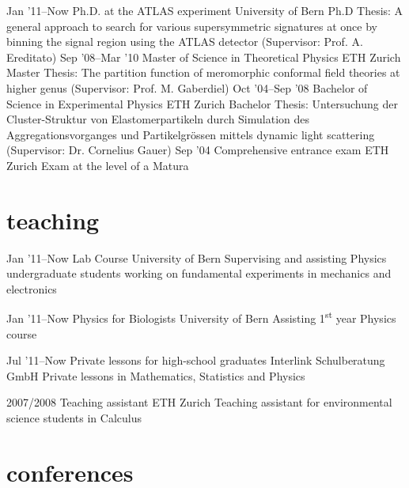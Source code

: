 \documentclass[]{cv} %
\begin{document}
\begin{entrylist}
\entry
{Jan '11--Now}
{Ph.D. {\normalfont at the} ATLAS experiment}
{University of Bern}
{Ph.D Thesis: A general approach to search for various supersymmetric signatures at once by binning the signal region using the ATLAS detector (Supervisor:
  Prof. A. Ereditato)}
\entry
{Sep '08--Mar '10}
{Master {\normalfont of Science in} Theoretical Physics}
{ETH Zurich}
{Master Thesis: The partition function of meromorphic conformal field theories at higher genus (Supervisor: Prof. M. Gaberdiel)}
\entry
{Oct '04--Sep '08}
{Bachelor {\normalfont of Science in} Experimental Physics}
{ETH Zurich}
{Bachelor Thesis: Untersuchung der Cluster-Struktur von Elastomerpartikeln durch Simulation des Aggregationsvorganges und Partikelgr{\"o}ssen mittels dynamic
light scattering (Supervisor: Dr. Cornelius Gauer)}
\entry
{Sep '04}
{Comprehensive entrance exam}
{ETH Zurich}
{Exam at the level of a Matura}
\end{entrylist}

\section{teaching}

\begin{entrylist}

\entry
{Jan '11--Now}
{Lab Course}
{University of Bern}
{Supervising and assisting Physics undergraduate students working on fundamental experiments in mechanics and electronics}

\entry
{Jan '11--Now}
{Physics for Biologists}
{University of Bern}
{Assisting 1\textsuperscript{st} year Physics course}

\entry
{Jul '11--Now}
{Private lessons for high-school graduates}
{Interlink Schulberatung GmbH}
{Private lessons in Mathematics, Statistics and Physics}

\entry
{2007/2008}
{Teaching assistant}
{ETH Zurich}
{Teaching assistant for environmental science students in Calculus}

\end{entrylist}

\section{conferences}
\end{document}
